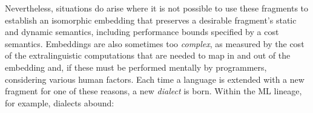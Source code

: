 \documentclass[10pt,preprint]{sigplanconf}
\begin{document}
Nevertheless, situations do arise where it is not possible to  use these fragments to establish an isomorphic embedding that preserves a desirable fragment's  static and dynamic semantics, including  performance bounds specified by a cost semantics. 
Embeddings are also sometimes too \emph{complex}, as measured by the cost of the extralinguistic computations that are needed to map in and out of the embedding and, if these  must be performed mentally by programmers, considering various human factors. %
Each time a language is extended with a new fragment for one of these reasons, a new \emph{dialect} is born. Within the ML lineage, for example, dialects abound:
%
\end{document}
